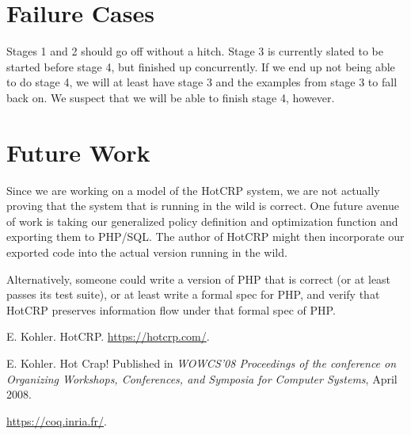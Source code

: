 \documentclass[11pt,journal]{IEEEtran}
\begin{document}
\section{Failure Cases}
Stages 1 and 2 should go off without a hitch.  Stage 3 is currently slated to be started before stage 4, but finished up concurrently.  If we end up not being able to do stage 4, we will at least have stage 3 and the examples from stage 3 to fall back on.  We suspect that we will be able to finish stage 4, however.

\section{Future Work}
Since we are working on a model of the HotCRP system, we are not actually proving that the system that is running in the wild is correct.  One future avenue of work is taking our generalized policy definition and optimization function and exporting them to PHP/SQL.  The author of HotCRP might then incorporate our exported code into the actual version running in the wild.

Alternatively, someone could write a version of PHP that is correct (or at least passes its test suite), or at least write a formal spec for PHP, and verify that HotCRP preserves information flow under that formal spec of PHP.

\begin{thebibliography}{9}
E. Kohler. HotCRP. \url{https://hotcrp.com/}.

E. Kohler. Hot Crap! Published in \textit{WOWCS'08 Proceedings of the conference on Organizing Workshops, Conferences, and Symposia for Computer Systems}, April 2008.

\url{https://coq.inria.fr/}.

\end{thebibliography}
\end{document}
